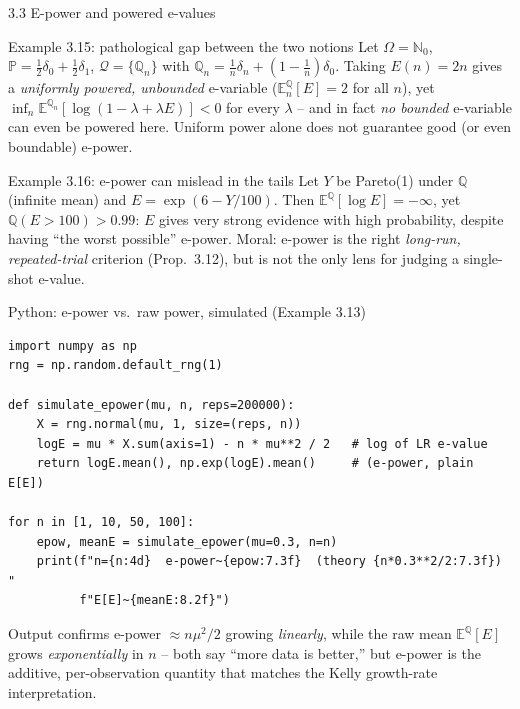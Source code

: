 \documentclass[aspectratio=169,10pt]{beamer}
\newcommand{\PP}{\mathbb{P}}
\newcommand{\QQ}{\mathbb{Q}}
\newcommand{\EE}{\mathbb{E}}
\newcommand{\calQ}{\mathcal{Q}}
\begin{document}
\begin{frame}[allowframebreaks]{3.3 E-power and powered e-values}
  \begin{exampleblock}{Example 3.15: pathological gap between the two notions}
    Let $\Omega=\mathbb{N}_0$, $\PP=\tfrac12\delta_0+\tfrac12\delta_1$, $\calQ=\{\QQ_n\}$ with $\QQ_n = \tfrac1n\delta_n + (1-\tfrac1n)\delta_0$. Taking $E(n)=2n$ gives a \emph{uniformly powered, unbounded} e-variable ($\EE^\QQ_n[E]=2$ for all $n$), yet $\inf_n \EE^{\QQ_n}[\log(1-\lambda+\lambda E)]<0$ for every $\lambda$ -- and in fact \emph{no bounded} e-variable can even be powered here. Uniform power alone does not guarantee good (or even boundable) e-power.
  \end{exampleblock}

  \begin{exampleblock}{Example 3.16: e-power can mislead in the tails}
    Let $Y$ be Pareto(1) under $\QQ$ (infinite mean) and $E=\exp(6-Y/100)$. Then $\EE^\QQ[\log E] = -\infty$, yet $\QQ(E>100)>0.99$: $E$ gives very strong evidence with high probability, despite having ``the worst possible'' e-power. Moral: e-power is the right \emph{long-run, repeated-trial} criterion (Prop.\ 3.12), but is not the only lens for judging a single-shot e-value.
  \end{exampleblock}
\end{frame}

\begin{frame}[fragile]{Python: e-power vs.\ raw power, simulated (Example 3.13)}
  \begin{lstlisting}
import numpy as np
rng = np.random.default_rng(1)

def simulate_epower(mu, n, reps=200000):
    X = rng.normal(mu, 1, size=(reps, n))
    logE = mu * X.sum(axis=1) - n * mu**2 / 2   # log of LR e-value
    return logE.mean(), np.exp(logE).mean()     # (e-power, plain E[E])

for n in [1, 10, 50, 100]:
    epow, meanE = simulate_epower(mu=0.3, n=n)
    print(f"n={n:4d}  e-power~{epow:7.3f}  (theory {n*0.3**2/2:7.3f})  "
          f"E[E]~{meanE:8.2f}")
  \end{lstlisting}
  Output confirms e-power $\approx n\mu^2/2$ growing \emph{linearly}, while the raw mean $\EE^\QQ[E]$ grows \emph{exponentially} in $n$ -- both say ``more data is better,'' but e-power is the additive, per-observation quantity that matches the Kelly growth-rate interpretation.
\end{frame}
\end{document}

